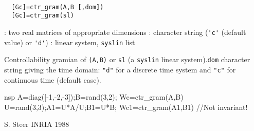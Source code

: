 \begin{mandesc}
   \\ %
\end{mandesc}
\begin{calling_sequence}
\begin{verbatim}
  [Gc]=ctr_gram(A,B [,dom])  
  [Gc]=ctr_gram(sl)  
\end{verbatim}
\end{calling_sequence}
\begin{parameters}
  \begin{varlist}
    : two real matrices of appropriate dimensions
    : character string (\verb!'c'! (default value) or \verb!'d'!)
    : linear system, \verb!syslin! list
  \end{varlist}
\end{parameters}
\begin{mandescription}
  Controllability gramian of \verb!(A,B)! or \verb!sl! (a \verb!syslin! 
  linear system).\verb!dom! character string giving the time domain: \verb!"d"! for a
  discrete time system and \verb!"c"! for continuous time (default case).
\end{mandescription}
\begin{examples}
  \begin{mintednsp}{nsp}
    A=diag([-1,-2,-3]);B=rand(3,2);
    Wc=ctr_gram(A,B)
    U=rand(3,3);A1=U*A/U;B1=U*B;
    Wc1=ctr_gram(A1,B1)    //Not invariant!
  \end{mintednsp}
\end{examples}
\begin{manseealso}
         
\end{manseealso}
\begin{authors}
  S. Steer INRIA 1988
\end{authors}
